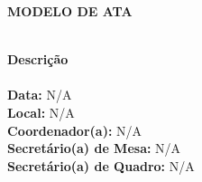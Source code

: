 \documentclass[12pt]{article}
\begin{document}
\pagestyle{pag1}

\begin{center}
	\LARGE\textbf{MODELO DE ATA}\\ 
\end{center}

\dividerline



\\ \textbf{\large Descrição}
\\
\\ \textbf{Data:} N/A
\\\textbf{ Local:} N/A
\\\textbf{Coordenador(a):} N/A
\\\textbf{ Secretário(a) de Mesa:} N/A
\\ \textbf{Secretário(a) de Quadro:} N/A
\\

\dividerline
\end{document}
